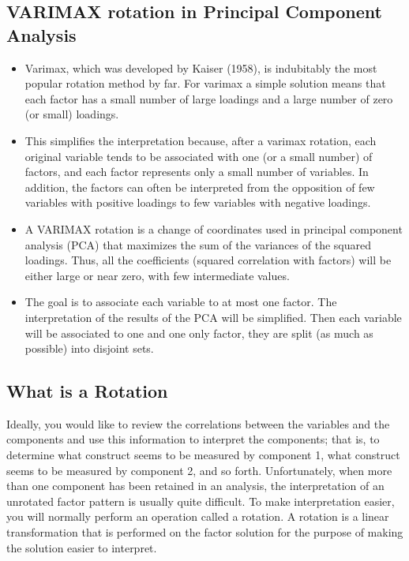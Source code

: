 \documentclass[a4paper,12pt]{article}
\begin{document}
\subsection{VARIMAX rotation in Principal Component Analysis}
\begin{itemize}
	\item Varimax, which was developed by Kaiser (1958), is indubitably the most
	popular rotation method by far. For varimax a simple solution means that each
	factor has a small number of large loadings and a large number of zero (or small)
	loadings.
	
	\item This simplifies the interpretation because, after a varimax rotation,
	each original variable tends to be associated with one (or a small number) of
	factors, and each factor represents only a small number of variables. In addition,
	the factors can often be interpreted from the opposition of few variables with
	positive loadings to few variables with negative loadings.
	
	
	\item A VARIMAX rotation is a change of coordinates used in principal component analysis (PCA) that maximizes the sum of the variances of the squared loadings. Thus, all the coefficients (squared correlation with factors) will be either large or near zero, with few intermediate values.
	
	\item The goal is to associate each variable to at most one factor. The interpretation of the results of the PCA will be simplified. Then each variable will be associated to one and one only factor, they are split (as much as possible) into disjoint sets.
\end{itemize}



\subsection{What is a Rotation}

Ideally, you would like to review the correlations between the variables and the
components and use this information to interpret the components; that is, to determine what
construct seems to be measured by component 1, what construct seems to be measured by
component 2, and so forth. Unfortunately, when more than one component has been retained in
an analysis, the interpretation of an unrotated factor pattern is usually quite difficult. To make
interpretation easier, you will normally perform an operation called a rotation. A rotation is a
linear transformation that is performed on the factor solution for the purpose of making the
solution easier to interpret.
\end{document}
